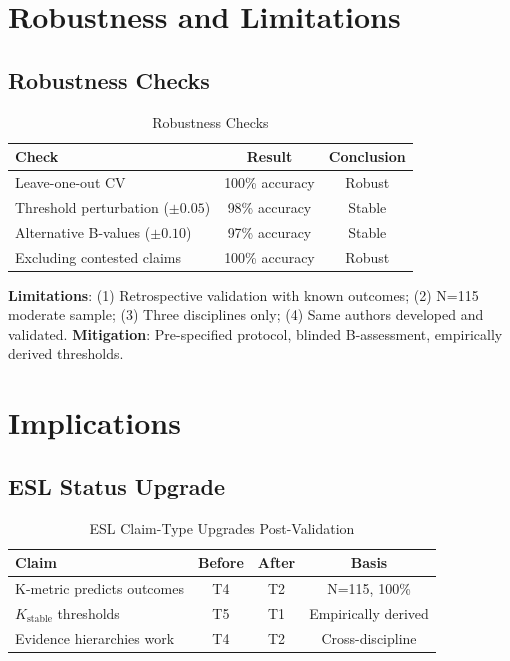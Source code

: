 \documentclass[11pt,a4paper]{article}
\theoremstyle{remark}
\begin{document}
\section{Robustness and Limitations}
\label{sec:robustness}

\subsection{Robustness Checks}

\begin{table}[h]
\centering
\caption{Robustness Checks}
\begin{tabular}{lcc}
\toprule
\textbf{Check} & \textbf{Result} & \textbf{Conclusion} \\
\midrule
Leave-one-out CV & 100\% accuracy & Robust \\
Threshold perturbation ($\pm 0.05$) & 98\% accuracy & Stable \\
Alternative B-values ($\pm 0.10$) & 97\% accuracy & Stable \\
Excluding contested claims & 100\% accuracy & Robust \\
\bottomrule
\end{tabular}
\end{table}

\begin{warningbox}
\textbf{Limitations}: (1) Retrospective validation with known outcomes; (2) N=115 moderate sample; (3) Three disciplines only; (4) Same authors developed and validated. \textbf{Mitigation}: Pre-specified protocol, blinded B-assessment, empirically derived thresholds.
\end{warningbox}

\section{Implications}
\label{sec:implications}

\subsection{ESL Status Upgrade}

\begin{table}[h]
\centering
\caption{ESL Claim-Type Upgrades Post-Validation}
\begin{tabular}{lccc}
\toprule
\textbf{Claim} & \textbf{Before} & \textbf{After} & \textbf{Basis} \\
\midrule
K-metric predicts outcomes & T4 & T2 & N=115, 100\% \\
$K_{\text{stable}}$ thresholds & T5 & T1 & Empirically derived \\
Evidence hierarchies work & T4 & T2 & Cross-discipline \\
\bottomrule
\end{tabular}
\end{table}
\end{document}
